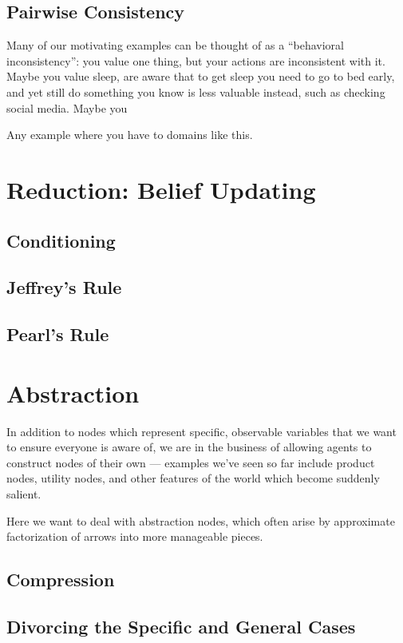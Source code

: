 \documentclass{article}
\begin{document}
	\subsection{Pairwise Consistency}
	Many of our motivating examples can be thought of as a ``behavioral inconsistency'': you value one thing, but your actions are inconsistent with it. Maybe you value sleep, are aware that to get sleep you need to go to bed early, and yet still do something you know is less valuable instead, such as checking social media. Maybe you 

	Any example where you have to domains like this.
	
	\section{Reduction: Belief Updating}
	\subsection{Conditioning}
	\subsection{Jeffrey's Rule}
	\subsection{Pearl's Rule}
	
	\section{Abstraction}
	In addition to nodes which represent specific, observable variables that we want to ensure everyone is aware of, we are in the business of allowing agents to construct nodes of their own --- examples we've seen so far include product nodes, utility nodes, and other features of the world which become suddenly salient.
	
	Here we want to deal with abstraction nodes, which often arise by approximate factorization of arrows into more manageable pieces.

	\subsection{Compression}
	\subsection{Divorcing the Specific and General Cases}
	
\end{document}
